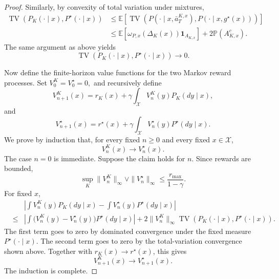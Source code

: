 \documentclass{article}
\newcommand{\1}{\mathbbm{1}}
\newcommand{\E}{\mathbb E}
\renewcommand{\H}{\mathcal{H}}
\numberwithin{equation}{section}
\def\to{\rightarrow}
\def\E{{\bf E}} \def\H{{\bf H}} \def\J{{\bf J}}
\def\E{\mathbb{E}}
\begin{document}
\begin{proof}
Similarly, by convexity of total variation under mixtures,
\[
\begin{aligned}
    \operatorname{TV}\!\left(P_K(\cdot\mid x),P^\star(\cdot\mid x)\right)
    &\le
    \E\left[
        \operatorname{TV}\!\left(
            P(\cdot\mid x,\bar a_T^{K,x}),
            P(\cdot\mid x,g^\star(x))
        \right)
    \right]  \\
    &\le
    \E\!\left[
        \omega_{P,x}(\Delta_K(x))\mathbf 1_{A_{K,x}}
    \right]
    +
    2\mathbb P(A_{K,x}^c).
\end{aligned}
\]
The same argument as above yields
\[
    \operatorname{TV}\!\left(P_K(\cdot\mid x),P^\star(\cdot\mid x)\right)
    \to 0.
\]

Now define the finite-horizon value functions for the two Markov reward processes.
Set
$
    V_0^K=V_0^\star=0,
$ and recursively define
\[
    V_{n+1}^K(x)
    =
    r_K(x)+\gamma\int_{\mathcal X}V_n^K(y)P_K(dy\mid x),
\]
and
\[
    V_{n+1}^\star(x)
    =
    r^\star(x)+\gamma\int_{\mathcal X}V_n^\star(y)P^\star(dy\mid x).
\]
We prove by induction that, for every fixed \(n\ge0\) and every fixed
\(x\in\mathcal X\),
\[
    V_n^K(x)\to V_n^\star(x).
\]
The case \(n=0\) is immediate. Suppose the claim holds for \(n\). Since rewards are bounded,
\[
    \sup_K\|V_n^K\|_\infty
    \vee
    \|V_n^\star\|_\infty
    \le
    \frac{r_{\max}}{1-\gamma}.
\]
For fixed \(x\),
\begin{eqnarray*}
    &&\left|
        \int V_n^K(y)P_K(dy\mid x)
        -
        \int V_n^\star(y)P^\star(dy\mid x)
    \right| \\
   &\le&
    \left|
        \int
        \bigl(V_n^K(y)-V_n^\star(y)\bigr)
        P^\star(dy\mid x)
    \right|
    +
    2\|V_n^K\|_\infty
    \operatorname{TV}\!\left(P_K(\cdot\mid x),P^\star(\cdot\mid x)\right).
\end{eqnarray*}
The first term goes to zero by dominated convergence under the fixed measure
\(P^\star(\cdot\mid x)\). The second term goes to zero by the total-variation
convergence shown above. Together with \(r_K(x)\to r^\star(x)\), this gives
\[
    V_{n+1}^K(x)\to V_{n+1}^\star(x).
\]
The induction is complete.


\end{proof}
\end{document}
